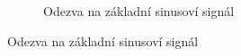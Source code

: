 \documentclass{article}
\begin{document}
\begin{figure}[H]
  \hfill
  \begin{minipage}[t]{0.45\textwidth}
    \vspace{-10mm}
    \begin{figure}[H]
      \caption{\label{prac_bod_sim_1} Odezva na základní sinusoví signál}
    \end{figure}
  \end{minipage}
\end{figure}
\end{document}
